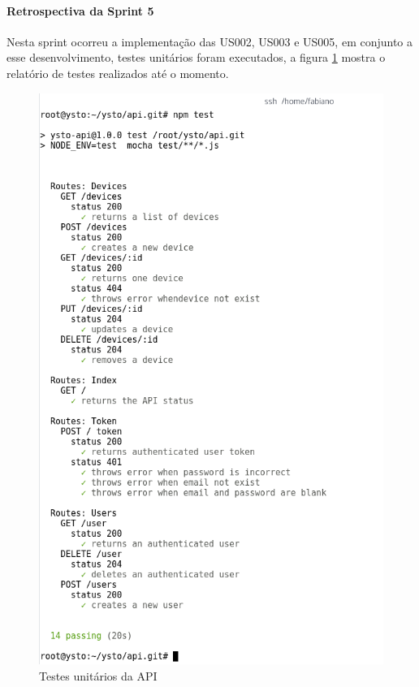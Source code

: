 \paragraph{Retrospectiva da Sprint 5} Nesta sprint ocorreu a implementação das US002, US003 e US005, em conjunto a esse desenvolvimento, testes unitários foram executados, a figura \ref{testes} mostra o relatório de testes realizados até o momento.

\begin{figure}[H]
\caption{\label{testes} Testes unitários da API}
\includegraphics[scale=0.5]{img/resultado-testes.png}
\end{figure}

